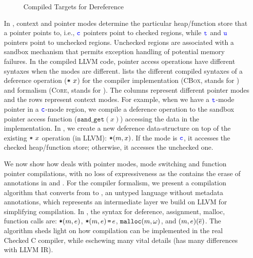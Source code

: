 {\begin{figure}[t!]
{}
\caption{Compiled Targets for Dereference}
\label{fig:flagtable}
\end{figure}

In \systemname, context and pointer modes determine the particular heap/function store that a pointer points to,
i.e., $\textcolor{blue}{\texttt{c}}$ pointers point to checked regions, while $\textcolor{blue}{\texttt{t}}$ and $\textcolor{blue}{\texttt{u}}$ pointers point to unchecked regions.
Unchecked regions are associated with a sandbox mechanism that permits exception handling of potential memory failures.
In the compiled LLVM code, pointer access operations have different syntaxes when the modes are different. 
 lists the different compiled syntaxes of a deference operation ($\texttt{*}~{x}$) for the compiler implementation (\textsc{CBox}, stands for \systemname) and formalism (\textsc{Core}, stands for \systemname). The columns represent different pointer modes and the rows represent context modes.
For example, when we have a $\textcolor{blue}{\texttt{t}}$-mode pointer in a $\textcolor{blue}{\texttt{c}}$-mode region, we compile a deference operation to the sandbox pointer access function ($\texttt{sand\_get}(x)$) accessing the data in the \systemname implementation. In \systemname, we create a new deference data-structure on top of the existing $\texttt{*}~{x}$ operation (in LLVM): $\texttt{*}({m},{x})$. If the mode is $\textcolor{blue}{\texttt{c}}$, it accesses the checked heap/function store; otherwise, it accesses the unchecked one.

We now show how \systemname deals with pointer modes, mode switching and function pointer compilations, 
with no loss of expressiveness
as the \checkedc contains the erase of annotations in \cite{li22checkedc} and .
For the compiler formalism, 
we present a compilation algorithm that converts from
\systemname to \elang, an untyped language without metadata
annotations, which represents an intermediate layer we build on LLVM for simplifying compilation. 
In \elang, the syntax for deference, assignment, malloc, function calls are: $\texttt{*}({m},{e})$, $\texttt{*}{(m,e)}\,\texttt{=}\, {e}$, 
$\mathtt{malloc}({m},{\omega})$, and ${(m,e)}({\overline{e}})$.
The algorithm sheds
  light on how compilation can be implemented in the real Checked C
  compiler, while eschewing many vital details (\elang has many 
  differences with LLVM IR).



}
